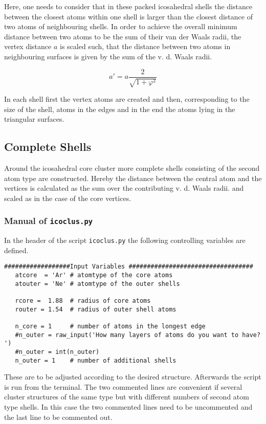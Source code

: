 Here, one needs to consider that in these packed icosahedral shells
the distance between the closest atoms within one shell is
larger than the closest distance of two atoms of neighbouring shells.
In order to achieve the overall minimum distance between two atoms
to be the sum of their van der Waals radii, the vertex
distance $a$ is scaled such, that the distance between two atoms
in neighbouring surfaces is given by
the sum of the v. d. Waals radii.

\begin{equation}
 a' = a \frac{2}{\sqrt{1+\varphi^2}}
\end{equation}

In each shell first the vertex atoms are created and then, corresponding
to the size of the shell, atoms in the edges and in the end the atoms
lying in the triangular surfaces.

\subsection{Complete Shells}
Around the icosahedral core cluster more complete shells consisting
of the second atom type are constructed. Hereby the distance between
the central atom and the vertices is calculated as the sum over the
contributing v. d. Waals radii. and scaled as in the case of the core
vertices.

\subsubsection{Manual of \lstinline|icoclus.py|}
In the header of the script \verb|icoclus.py| the following
controlling variables are defined.

\begin{lstlisting}
##################Input Variables ##################################
   atcore  = 'Ar' # atomtype of the core atoms
   atouter = 'Ne' # atomtype of the outer shells
   
   rcore =  1.88  # radius of core atoms
   router = 1.54  # radius of outer shell atoms
   
   n_core = 1     # number of atoms in the longest edge
   #n_outer = raw_input('How many layers of atoms do you want to have? ')
   #n_outer = int(n_outer)
   n_outer = 1    # number of additional shells
\end{lstlisting}

These are to be adjusted according to the desired structure.
Afterwards the script is run from the terminal.
The two commented lines are convenient if several cluster structures
of the same type but with different numbers of second atom type shells.
In this case the two commented lines need to be uncommented and the last
line to be commented out.

